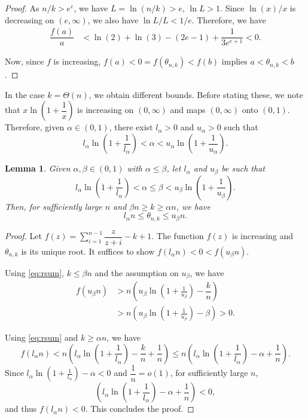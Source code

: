 \documentclass{amsart}
\newtheorem{lem}[thm]{Lemma}
\begin{document}
\begin{proof}
As $n/k>e^{e}$, we have $L=\ln(n/k)>e$, $\ln L>1$. Since $\ln(x)/x$ is decreasing on $(e,\infty)$, we also have $\ln L/L < 1/e$. Therefore, we have
\begin{align*}
\dfrac{f(a)}{a}&<\ln(2)+\ln(3)-(2e-1)+\dfrac{1}{3e^{e+1}}<0.
\end{align*}

Now, since $f$ is increasing, $f(a)< 0=f(\theta_{n,k})<f(b)$ implies $a< \theta_{n,k}<b$. 
\end{proof}

In the case $k=\Theta(n)$, we obtain different bounds. Before stating these, we note that $x\ln\left(1+\dfrac{1}{x}\right)$ is increasing on $(0,\infty)$ and maps $(0,\infty)$ onto $(0,1)$. Therefore, given $\alpha \in (0,1)$, there exist $l_{\alpha}>0$ and $u_{\alpha}>0$ such that
\[l_{\alpha}\ln\left(1+\dfrac{1}{l_{\alpha}}\right)<\alpha < u_{\alpha}\ln\left(1+\dfrac{1}{u_{\alpha}}\right).\]

\begin{lem}\label{lem:thetaboundlin}
Given $\alpha,\beta \in (0,1)$ with $\alpha\leq\beta$, let $l_{\alpha}$ and $u_{\beta}$ be such that
\[l_{\alpha}\ln\left(1+\dfrac{1}{l_{\alpha}}\right)<\alpha\leq \beta < u_{\beta}\ln\left(1+\dfrac{1}{u_{\beta}}\right).\] Then, for sufficiently large $n$ and $\beta n\geq k \geq \alpha n$, we have
\[l_{\alpha}n\leq \theta_{n,k} \leq u_{\beta}n.\] 
\end{lem}
\begin{proof}
Let $f(z)=\sum\limits_{i=1}^{n-1} \dfrac{z}{z+i}-k+1$. The function $f(z)$ is increasing and $\theta_{n,k}$ is its unique root. It suffices to show $f(l_{\alpha}n)<0<f(u_{\beta}n)$.

Using \eqref{eq:rsum}, $k\leq \beta n$ and the assumption on $u_{\beta}$, we have
\begin{align*}
f(u_{\beta}n)&> n\left( u_{\beta}\ln\left(1 + \frac{1}{u_{\beta}}\right) -\dfrac{k}{n}\right) \\
&>  n\left( u_{\beta}\ln\left(1 + \frac{1}{u_{\beta}}\right) -\beta \right) >0.
\end{align*}

Using \eqref{eq:rsum} and $k\geq \alpha n$, we have
\[
f(l_{\alpha}n)< n\left( l_{\alpha}\ln\left(1 + \frac{1}{l_{\alpha}}\right) -\dfrac{k}{n}+\dfrac{1}{n}\right)
\leq n\left( l_{\alpha}\ln\left(1 + \frac{1}{l_{\alpha}}\right) -\alpha+\dfrac{1}{n}\right).
\]
Since $l_{\alpha}\ln\left(1 + \frac{1}{l_{\alpha}}\right) -\alpha<0$ and $\dfrac{1}{n}=o(1)$, for sufficiently large $n$,
\[\left( l_{\alpha}\ln\left(1 + \frac{1}{l_{\alpha}}\right) -\alpha+\dfrac{1}{n}\right)<0,\] and thus $f(l_{\alpha} n)<0$.
This concludes the proof.
\end{proof}
\end{document}

